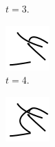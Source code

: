 \begin{figure}
\begin{subfigure}{.1\textwidth}
        \caption{$t=3$.}
    \end{subfigure}
    \begin{subfigure}{.1\textwidth}
        \includegraphics[width=\textwidth]{graphics/work-artifacts/marked/full/3/test-3.png}
        \caption{$t=4$.}
    \end{subfigure}
    \begin{subfigure}{.1\textwidth}
        \includegraphics[width=\textwidth]{graphics/work-artifacts/marked/full/3/test-4.png}

\end{subfigure}
\end{figure}
